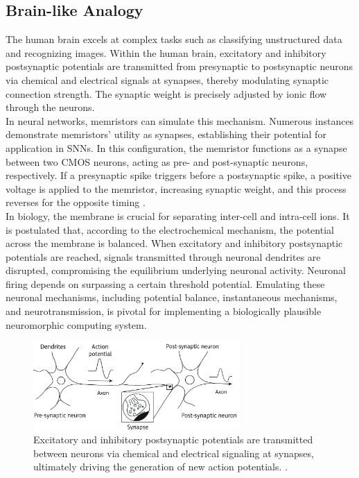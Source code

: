 \subsection[Brain-like Analogy]{Brain-like Analogy}

The human brain excels at complex tasks such as classifying unstructured data and recognizing images. Within the human brain, excitatory and inhibitory postsynaptic potentials are transmitted from presynaptic to postsynaptic neurons via chemical and electrical signals at synapses, thereby modulating synaptic connection strength. The synaptic weight is precisely adjusted by ionic flow through the neurons. \\

\noindent In neural networks, memristors can simulate this mechanism. Numerous instances demonstrate memristors' utility as synapses, establishing their potential for application in SNNs. In this configuration, the memristor functions as a synapse between two CMOS neurons, acting as pre- and post-synaptic neurons, respectively. If a presynaptic spike triggers before a postsynaptic spike, a positive voltage is applied to the memristor, increasing synaptic weight, and this process reverses for the opposite timing \cite{chang2011short}. \\

\noindent In biology, the membrane is crucial for separating inter-cell and intra-cell ions. It is postulated that, according to the electrochemical mechanism, the potential across the membrane is balanced. When excitatory and inhibitory postsynaptic potentials are reached, signals transmitted through neuronal dendrites are disrupted, compromising the equilibrium underlying neuronal activity. Neuronal firing depends on surpassing a certain threshold potential. Emulating these neuronal mechanisms, including potential balance, instantaneous mechanisms, and neurotransmission, is pivotal for implementing a biologically plausible neuromorphic computing system.\\


\begin{figure}[htbp!] 
    \centering    
    \includegraphics[width=0.7\textwidth]{Chapter6/Figs/a.png}
    \caption[Excitatory and inhibitory postsynaptic potentials are transmitted between neurons via chemical and electrical signaling at synapses.]{Excitatory and inhibitory postsynaptic potentials are transmitted between neurons via chemical and electrical signaling at synapses, ultimately driving the generation of new action potentials. \cite{burr2017neuromorphic}.}
    \label{fig:6a}
    \end{figure}

